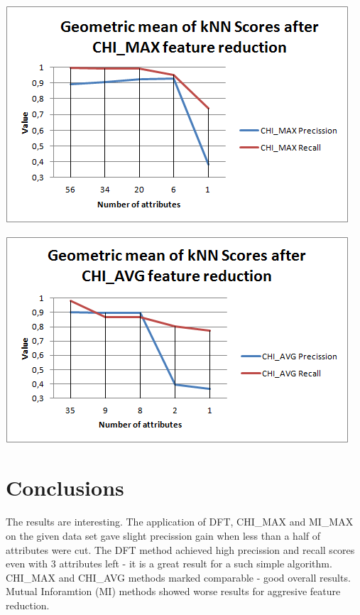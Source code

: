 \documentclass[12pt,a4paper]{report}
\begin{document}
\includegraphics[scale=1]{CHIMAXscores}

\includegraphics[scale=1]{CHIAVGscores}

\chapter{Conclusions}
The results are interesting. The application of DFT, CHI\_MAX and MI\_MAX on the given data set gave slight precission gain when less than a half of attributes were cut. The DFT method achieved high precission and recall scores even with 3 attributes left - it is a great result for a such simple algorithm. CHI\_MAX and CHI\_AVG methods marked comparable - good overall results. Mutual Inforamtion (MI) methods showed worse results for aggresive feature reduction.
\end{document}

